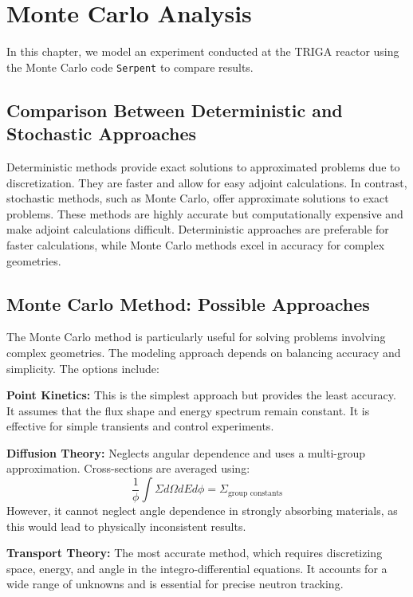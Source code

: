 \section{Monte Carlo Analysis}

In this chapter, we model an experiment conducted at the TRIGA reactor using the Monte Carlo code \texttt{Serpent} to compare results.

\subsection{Comparison Between Deterministic and Stochastic Approaches}

Deterministic methods provide exact solutions to approximated problems due to discretization. They are faster and allow for easy adjoint calculations. In contrast, stochastic methods, such as Monte Carlo, offer approximate solutions to exact problems. These methods are highly accurate but computationally expensive and make adjoint calculations difficult. Deterministic approaches are preferable for faster calculations, while Monte Carlo methods excel in accuracy for complex geometries.

\subsection{Monte Carlo Method: Possible Approaches}

The Monte Carlo method is particularly useful for solving problems involving complex geometries. The modeling approach depends on balancing accuracy and simplicity. The options include:

\textbf{Point Kinetics:} This is the simplest approach but provides the least accuracy. It assumes that the flux shape and energy spectrum remain constant. It is effective for simple transients and control experiments.

\textbf{Diffusion Theory:} Neglects angular dependence and uses a multi-group approximation. Cross-sections are averaged using:
\begin{equation}
\frac{1}{\phi}\int \Sigma d\Omega dE d\phi = \Sigma_{\text{group constants}}
\end{equation}
However, it cannot neglect angle dependence in strongly absorbing materials, as this would lead to physically inconsistent results.

\textbf{Transport Theory:} The most accurate method, which requires discretizing space, energy, and angle in the integro-differential equations. It accounts for a wide range of unknowns and is essential for precise neutron tracking.

